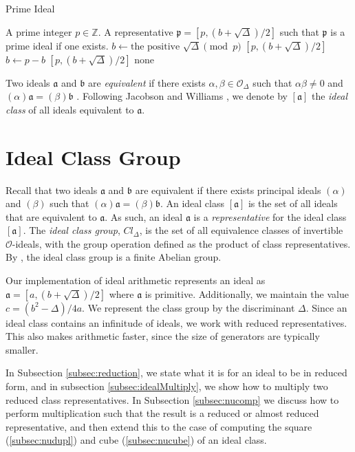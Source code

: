 \documentclass{ucalgthes1}
\theoremstyle{definition}
\newcommand{\OO}{\mathcal{O}}
\newcommand{\ZZ}{\mathbb{Z}}
\begin{document}
\begin{algorithm}[h]
\caption{Prime Ideal}
\label{alg:prime}
\begin{algorithmic}[1]
\REQUIRE A prime integer $p \in \ZZ$.
\ENSURE A representative $\mathfrak p = [p, (b+\sqrt\Delta)/2]$ such that $\mathfrak p$ is a prime ideal if one exists.
\STATE $b \gets \textrm{the positive } \sqrt\Delta \pmod p$
	\RETURN $[p, (b+\sqrt\Delta)/2]$
\ENDIF
\STATE $b \gets p-b$
	\RETURN $[p, (b+\sqrt\Delta)/2]$
\ENDIF
\RETURN none
\end{algorithmic}
\end{algorithm}

Two ideals $\mathfrak a$ and $\mathfrak b$ are \emph{equivalent} if there exists $\alpha, \beta \in \OO_\Delta$ such that $\alpha \beta \neq 0$ and $(\alpha)\mathfrak a = (\beta) \mathfrak b$ \cite[p.88]{Jacobson2009}.  Following Jacobson and Williams \cite[p.88]{Jacobson2009}, we denote by $[\mathfrak a]$ the \emph{ideal class} of all ideals equivalent to $\mathfrak a$. 


\bigbreak
\section{Ideal Class Group}

Recall that two ideals $\mathfrak a$ and $\mathfrak b$ are equivalent if there exists principal ideals $(\alpha)$ and $(\beta)$ such that $(\alpha)\mathfrak a = (\beta)\mathfrak b$.  An ideal class $[\mathfrak a]$ is the set of all ideals that are equivalent to $\mathfrak a$. As such, an ideal $\mathfrak a$ is a \emph{representative} for the ideal class $[\mathfrak a]$. The \emph{ideal class group}, $Cl_\Delta$, is the set of all equivalence classes of invertible $\OO$-ideals, with the group operation defined as the product of class representatives. By \cite[p.136]{Cohn1980}, the ideal class group is a finite Abelian group.

Our implementation of ideal arithmetic represents an ideal as $\mathfrak a = [a, (b + \sqrt\Delta)/2]$ where $\mathfrak a$ is primitive.  Additionally, we maintain the value $c = (b^2 - \Delta)/4a$.  We represent the class group by the discriminant $\Delta$. Since an ideal class contains an infinitude of ideals, we work with reduced representatives.  This also makes arithmetic faster, since the size of generators are typically smaller.

In Subsection \ref{subsec:reduction}, we state what it is for an ideal to be in reduced form, and in subsection \ref{subsec:idealMultiply}, we show how to multiply two reduced class representatives. In Subsection \ref{subsec:nucomp} we discuss how to perform multiplication such that the result is a reduced or almost reduced representative, and then extend this to the case of computing the square (\ref{subsec:nudupl}) and cube (\ref{subsec:nucube}) of an ideal class.  
\end{document}
